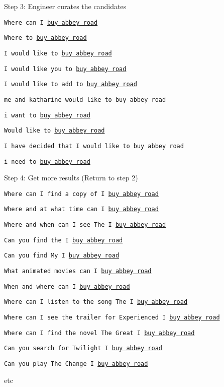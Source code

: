 \documentclass[12pt]{beamer}
\begin{document}
  \begin{frame}{Step 3: Engineer curates the candidates}

    \texttt{Where can I \underline{buy abbey road}}

    \texttt{Where to \underline{buy abbey road}}

    \texttt{I would like to \underline{buy abbey road}}

    \bigskip 

    \texttt{I would like you to \underline{buy abbey road}}

    \texttt{I would like to add to \underline{buy abbey road}}

    \texttt{me and katharine would like to buy abbey road}

    \texttt{i want to \underline{buy abbey road}}

    \texttt{Would like to \underline{buy abbey road}}

    {\small \texttt{I have decided that I would like to buy abbey road}}

    \texttt{i need to \underline{buy abbey road}}

  \end{frame}

\begin{frame}{Step 4: Get more results (Return to step 2)}

  
\texttt{Where can I find a copy of I \underline{buy abbey road}}

\texttt{Where and at what time can I \underline{buy abbey road}}

\texttt{Where and when can I see The I \underline{buy abbey road}}

\texttt{Can you find the I \underline{buy abbey road}}

\texttt{Can you find My I \underline{buy abbey road}}

\texttt{What animated movies can I \underline{buy abbey road}}

\texttt{When and where can I \underline{buy abbey road}}

\texttt{Where can I listen to the song The I \underline{buy abbey road}}

\texttt{Where can I see the trailer for Experienced I \underline{buy abbey
  road}}

\texttt{Where can I find the novel The Great I \underline{buy abbey road}}

\texttt{Can you search for Twilight I \underline{buy abbey road}}

\texttt{Can you play The Change I \underline{buy abbey road}}


etc

\end{frame}
\end{document}
